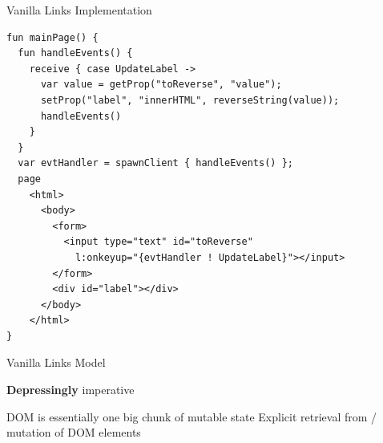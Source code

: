 \documentclass[11.5pt, aspectratio=169]{beamer}
\begin{document}
\begin{frame}[fragile]{Vanilla Links Implementation}
  \begin{lstlisting}[language=links]
fun mainPage() {
  fun handleEvents() {
    receive { case UpdateLabel ->
      var value = getProp("toReverse", "value");
      setProp("label", "innerHTML", reverseString(value));
      handleEvents()
    }
  }
  var evtHandler = spawnClient { handleEvents() };
  page
    <html>
      <body>
        <form>
          <input type="text" id="toReverse"
            l:onkeyup="{evtHandler ! UpdateLabel}"></input>
        </form>
        <div id="label"></div>
      </body>
    </html>
}
  \end{lstlisting}
\end{frame}

\begin{frame}{Vanilla Links Model}

  \begin{center}
  \end{center}

  \begin{fullpageitemize}
  \itemR \textbf{Depressingly} imperative
    \begin{itemize}
  \itemR DOM is essentially one big chunk of mutable state
  \itemR Explicit retrieval from / mutation of DOM elements
  \end{itemize}
  \end{fullpageitemize}
\end{frame}


\end{document}
